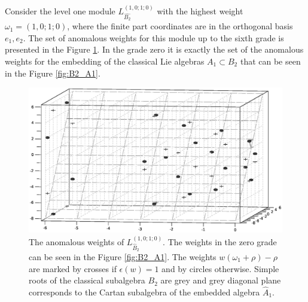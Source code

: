 \documentclass[12pt]{iopart}
\theoremstyle{definition}
\begin{document}
Consider the level one module $L^{\left( 1,0;1;0 \right)}_{\hat{B_2}}$  with the highest weight $\omega_1=(1,0;1;0)$,
where the finite part coordinates are in the orthogonal basis $e_1,e_2$.
The set of anomalous weights for this module up to the sixth grade is presented in the Figure \ref{fig:affine_B2_anom_point}.
In the grade zero it is exactly the set of the anomalous weights for the embedding of
the classical Lie algebras $A_1\subset B_2$ that can be seen in the  Figure \ref{fig:B2_A1}.

\begin{figure}[h!tb]
  \includegraphics[width=140mm]{figure11.eps}
  \caption{The anomalous weights of $L^{(1,0;1;0)}_{\hat B_2 }$.
  The weights in the zero grade can be seen in the Figure \ref{fig:B2_A1}. The weights $w (\omega_1+\rho)-\rho$ are marked by crosses if $\epsilon(w)=1$ and by circles otherwise.
Simple roots of the classical subalgebra $B_2$ are grey and grey diagonal plane corresponds to the Cartan subalgebra
of the embedded algebra $\hat{A}_1$.}
  \label{fig:affine_B2_anom_point}
\end{figure}
\end{document}
